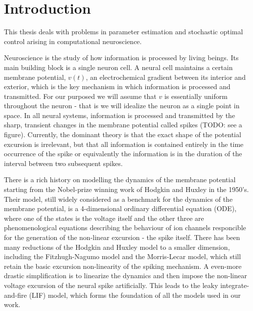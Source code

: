 \documentclass{report}
\begin{document}
\listoftables
\clearpage 
\listoffigures

\pagestyle{headings} 


\chapter{Introduction}
This thesis deals with problems in parameter estimation and
stochastic optimal control arising in computational neuroscience. 

Neuroscience is the study of how information is processed by living beings. Its
main building block is a single neuron cell. A neural cell maintains a certain
membrane potential, $v(t)$, an electrochemical gradient between its interior and
exterior, which is the key mechanism in which information is processed and
transmitted. For our purposed we will assume that $v$ is essentially uniform
throughout the neuron - that is we will idealize the neuron as a single point in
space. In all neural systems, information is processed and transmitted by the
sharp, transient changes in the membrane potential called spikes (TODO: see a
figure). Currently, the dominant theory is that the exact shape of the potential
excursion is irrelevant, but that all information is contained entirely in the
time occurrence of the spike or equivalently the information is in
the duration of the interval between two subsequent spikes.

There is a rich history on modelling the dynamics of the membrane potential
starting from the Nobel-prize winning work of Hodgkin and Huxley in the 1950's.
Their model, still widely considered as a benchmark for the dynamics of the
membrane potential, is a 4-dimensional ordinary differential equation (ODE),
where one of the states is the voltage itself and the other three are phenomenological
equations describing the behaviour of ion channels responcible for the
generation of the non-linear excursion - the spike itself. There has been many
reductions of the Hodgkin and Huxley model to a smaller dimension, including the
Fitzhugh-Nagumo model and the Morris-Lecar model, which still retain the basic
excursion non-linearity of the spiking mechanism. A even-more drastic
simplification is to linearize the dynamics and then impose the non-linear
voltage excursion of the neural spike artificially. This leads to the leaky
integrate-and-fire (LIF) model, which
forms the foundation of all the models used in our work.
\end{document}
